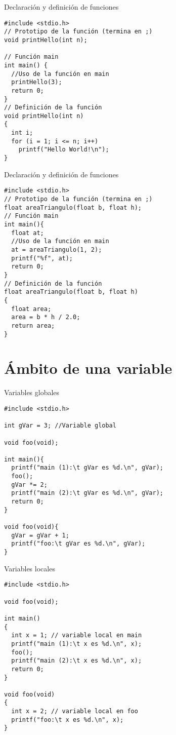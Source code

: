 \documentclass[xcolor={usenames,svgnames,dvipsnames}, aspectratio=169]{beamer}
\begin{document}
\begin{frame}[label={sec:org5167c5b},fragile,plain]{Declaración y definición de funciones}
 \lstset{language=C,label= ,caption= ,captionpos=b,numbers=none}
\begin{lstlisting}
#include <stdio.h>
// Prototipo de la función (termina en ;)
void printHello(int n);

// Función main
int main() {
  //Uso de la función en main
  printHello(3);
  return 0;
}
// Definición de la función
void printHello(int n)
{
  int i;
  for (i = 1; i <= n; i++)
    printf("Hello World!\n");
}
\end{lstlisting}
\end{frame}


\begin{frame}[label={sec:orgf7eaa07},fragile,plain]{Declaración y definición de funciones}
 \lstset{language=C,label= ,caption= ,captionpos=b,numbers=none}
\begin{lstlisting}
#include <stdio.h>
// Prototipo de la función (termina en ;)
float areaTriangulo(float b, float h);
// Función main
int main(){
  float at;
  //Uso de la función en main
  at = areaTriangulo(1, 2);
  printf("%f", at);
  return 0;
}
// Definición de la función
float areaTriangulo(float b, float h)
{
  float area;
  area = b * h / 2.0;
  return area;
}
\end{lstlisting}
\end{frame}

\section{Ámbito de una variable}
\label{sec:org149900e}

\begin{frame}[label={sec:orgd4529b5},fragile,plain]{Variables globales}
 \lstset{language=C,label= ,caption= ,captionpos=b,numbers=none}
\begin{lstlisting}
#include <stdio.h>

int gVar = 3; //Variable global

void foo(void);

int main(){
  printf("main (1):\t gVar es %d.\n", gVar);
  foo();
  gVar *= 2;
  printf("main (2):\t gVar es %d.\n", gVar);
  return 0;
}

void foo(void){
  gVar = gVar + 1;
  printf("foo:\t gVar es %d.\n", gVar);
}
\end{lstlisting}
\end{frame}

\begin{frame}[label={sec:orgc494eea},fragile,plain]{Variables locales}
 \lstset{language=C,label= ,caption= ,captionpos=b,numbers=none}
\begin{lstlisting}
#include <stdio.h>

void foo(void);

int main()
{
  int x = 1; // variable local en main
  printf("main (1):\t x es %d.\n", x);
  foo();
  printf("main (2):\t x es %d.\n", x);
  return 0;
}

void foo(void)
{
  int x = 2; // variable local en foo
  printf("foo:\t x es %d.\n", x);
}
\end{lstlisting}
\end{frame}
\end{document}
